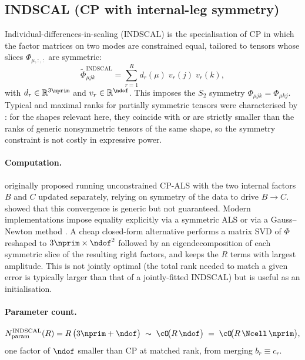 \subsection{INDSCAL (CP with internal-leg symmetry)}
\label{sub:fc3_indscal}
Individual-differences-in-scaling (INDSCAL) \cite{carroll_analysis_1970, kolda_tensor_2009} is the
specialisation of CP in which the factor matrices on two modes are constrained equal, tailored
to tensors whose slices $\Phi_{\mu,:,:}$ are symmetric:
\begin{equation}\label{eq:fc3_indscal_ansatz}
    \tilde\Phi_{\mu j k}^{\mathrm{INDSCAL}}
    = \sum_{r=1}^{R} d_r(\mu)\; v_r(j)\; v_r(k),
\end{equation}
with $d_r\in\mathbb{R}^{3\nprim}$ and $v_r\in\mathbb{R}^{\ndof}$. This imposes the $S_2$
symmetry $\Phi_{\mu j k}=\Phi_{\mu k j}$. Typical and maximal ranks for
partially symmetric tensors were characterised by
\citet{ten_berge_typical_2004}: for the shapes relevant here, they coincide with or
are strictly smaller than the ranks of generic nonsymmetric tensors of the same shape, so the
symmetry constraint is not costly in expressive power.

\paragraph{Computation.} \citet{carroll_analysis_1970} originally proposed running unconstrained
CP-ALS with the two internal factors $B$ and $C$ updated separately, relying on symmetry of the
data to drive $B\to C$. \citet{ten_berge_typical_2004, ten_berge_carroll_2009} showed that this convergence is generic
but not guaranteed. Modern implementations impose equality explicitly via a symmetric ALS or via
a Gauss--Newton method \cite{kolda_tensor_2009, kolda_numerical_2015}.
A cheap closed-form alternative performs a matrix SVD of $\Phi$ reshaped to
$3\nprim\times\ndof^{2}$ followed by an eigendecomposition of each symmetric slice of the
resulting right factors, and keeps the $R$ terms with largest amplitude. This is not jointly
optimal (the total rank needed to match a given error is typically larger than that of a
jointly-fitted INDSCAL) but is useful as an initialisation.

\paragraph{Parameter count.}
\begin{equation}\label{eq:fc3_indscal_params}
  N_{\mathrm{param}}^{\mathrm{INDSCAL}}(R)
  = R\,\bigl(3\nprim + \ndof\bigr)
  \;\sim\; \cO\!\bigl(R\,\ndof\bigr)
  \;=\; \cO\!\bigl(R\,\Ncell\,\nprim\bigr),
\end{equation}
one factor of $\ndof$ smaller than CP at matched rank, from merging $b_r\equiv c_r$.

